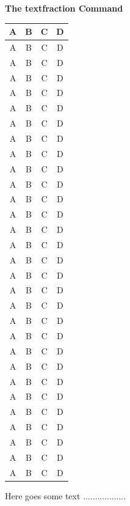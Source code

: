 \documentclass{article}
\begin{document}
	{\centering\Huge\bf The textfraction Command}
	
		\begin{table}[h]
		\begin{tabular}{|*{4}{c|}}
			\hline A & B & C & D \\ \hline
			\hline A & B & C & D \\ \hline
			\hline A & B & C & D \\ \hline
			\hline A & B & C & D \\ \hline
			\hline A & B & C & D \\ \hline
			\hline A & B & C & D \\ \hline
			\hline A & B & C & D \\ \hline
			\hline A & B & C & D \\ \hline
			\hline A & B & C & D \\ \hline
			\hline A & B & C & D \\ \hline
			\hline A & B & C & D \\ \hline
			\hline A & B & C & D \\ \hline
			\hline A & B & C & D \\ \hline
			\hline A & B & C & D \\ \hline
			\hline A & B & C & D \\ \hline
			\hline A & B & C & D \\ \hline
			\hline A & B & C & D \\ \hline
			\hline A & B & C & D \\ \hline
			\hline A & B & C & D \\ \hline
			\hline A & B & C & D \\ \hline
			\hline A & B & C & D \\ \hline
			\hline A & B & C & D \\ \hline
			\hline A & B & C & D \\ \hline
			\hline A & B & C & D \\ \hline
			\hline A & B & C & D \\ \hline
			\hline A & B & C & D \\ \hline
			\hline A & B & C & D \\ \hline
			\hline A & B & C & D \\ \hline
			\hline A & B & C & D \\ \hline
			\hline A & B & C & D \\ \hline
		\end{tabular}
	\end{table}
	
	Here goes some text ..................
\end{document}
